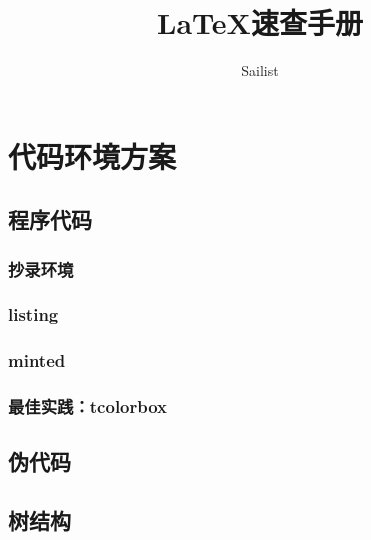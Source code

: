 \documentclass{article}
\title{\LaTeX{}速查手册}
\author{Sailist}
\begin{document}
    \maketitle
    \clearpage
    \renewcommand{\baselinestretch}{0.75}\normalsize
    \tableofcontents
    \listoffigures
    \listoftables
    \newpage
    \renewcommand{\baselinestretch}{1.3}\normalsize
    
    

    \section{代码环境方案}
    \subsection{程序代码}
    \subsubsection{抄录环境}
    \subsubsection{listing}
    \subsubsection{minted}
    \subsubsection{最佳实践：tcolorbox}
    \subsection{伪代码}
    
    \subsection{树结构}
\end{document}
